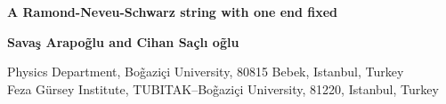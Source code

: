 \documentclass[a4paper,a4paper]{article}
\begin{document}
\providecommand{\Author}    {\large\bf Sava\c{s} Arapo\~glu\myHighlight{$^{a}$}\coordHE{} and Cihan Sa\c cl\i
o\~glu\myHighlight{$^{a,b}$}\coordHE{}}

\def\toprule{\noalign{\hrule \medskip}}
\def\midrule{\noalign{\medskip\hrule }}
\def\botrule{\noalign{\medskip\hrule }}
\setlength{\parskip}{\medskipamount}
\providecommand{\ud}{{\mathrm{d}}}



\begin{titlepage}
%
%
%
%
\begin{center}
    \huge\bf\boldmath
A Ramond-Neveu-Schwarz string with one end fixed
\end{center}
\bigskip
%
%
\begin{center}
\Author
\end{center}

\begin{center}
{\small
{}\coordHE{} Physics Department, Bo\~gazi\c ci University, 80815 Bebek,
Istanbul, Turkey\\
\coordHE{} Feza G\"ursey Institute, TUBITAK--Bo\~gazi\c ci University,
81220,
Istanbul, Turkey }

\end{center}

\bigskip
%
%
\begin{abstract}%


\end{abstract}
\end{titlepage}
\end{document}
